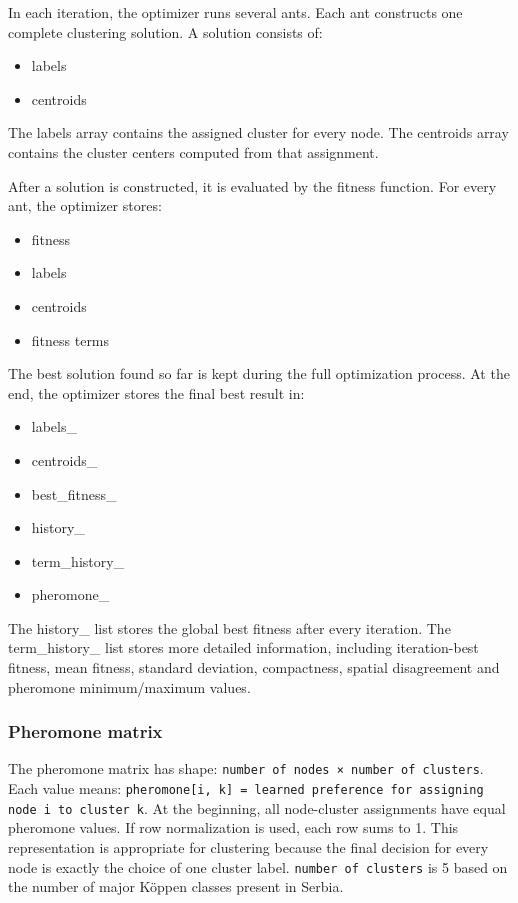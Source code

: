\documentclass[11pt]{article}
\begin{document}
In each iteration, the optimizer runs several ants. Each ant constructs one complete clustering solution. A solution consists of:
\begin{itemize}
  \item labels
  \item centroids
\end{itemize}
The labels array contains the assigned cluster for every node. The centroids array contains the cluster centers computed from that assignment.

After a solution is constructed, it is evaluated by the fitness function. For every ant, the optimizer stores:
\begin{itemize}
  \item fitness
  \item labels
  \item centroids
  \item fitness terms
\end{itemize}

The best solution found so far is kept during the full optimization process. At the end, the optimizer stores the final best result in:
\begin{itemize}
  \item labels\_
  \item centroids\_
  \item best\_fitness\_
  \item history\_
  \item term\_history\_
  \item pheromone\_
\end{itemize}

The history\_ list stores the global best fitness after every iteration. The term\_history\_ list stores more detailed information, including iteration-best fitness, mean fitness, standard deviation, compactness, spatial disagreement and pheromone minimum/maximum values.

\subsubsection{Pheromone matrix}
The pheromone matrix has shape:
\texttt{number of nodes × number of clusters}.
Each value means:
\texttt{pheromone[i, k] = learned preference for assigning node i to cluster k}. 
At the beginning, all node-cluster assignments have equal pheromone values. If row normalization is used, each row sums to 1. This representation is appropriate for clustering because the final decision for every node is exactly the choice of one cluster label. \texttt{number of clusters} is 5 based on the number of major Köppen classes present in Serbia.
\end{document}
